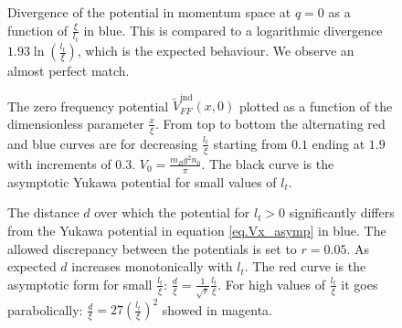 \begin{figure} 
\begin{center}  
  
\caption{Divergence of the potential in momentum space at $q=0$ as a function of $\frac{\xi}{l_t}$ in blue. This is compared to a logarithmic divergence $1.93\ln\left(\frac{l_t}{\xi}\right)$, which is the expected behaviour. We observe an almost perfect match.}  
\label{fig.Vq0}  
\end{center}    
\end{figure}

\begin{figure} 
\begin{center}  
  
\caption{The zero frequency potential $\tilde{V}_{FF}^\text{ind}(x,0)$ plotted as a function of the dimensionless parameter $\frac{x}{\xi}$. From top to bottom the alternating red and blue curves are for decreasing $\frac{l_t}{\xi}$ starting from $0.1$ ending at $1.9$ with increments of $0.3$. $V_0 = \frac{m_Bg^2n_0}{\pi}$. The black curve is the asymptotic Yukawa potential for small values of $l_t$.}  
\label{fig.Vx}  
\end{center}    
\end{figure}

\begin{figure} 
\begin{center}  
  
\caption{The distance $d$ over which the potential for $l_t > 0$ significantly differs from the Yukawa potential in equation \eqref{eq.Vx_asymp} in blue. The allowed discrepancy between the potentials is set to $r=0.05$. As expected $d$ increases monotonically with $l_t$. The red curve is the asymptotic form for small $\frac{l_t}{\xi}$: $\frac{d}{\xi}=\frac{1}{\sqrt{r}}\frac{l_t}{\xi}$. For high values of $\frac{l_t}{\xi}$ it goes parabolically: $\frac{d}{\xi}=27\left(\frac{l_t}{\xi}\right)^2$ showed in magenta.}  
\label{fig.Vx_disc}  
\end{center}    
\end{figure}

